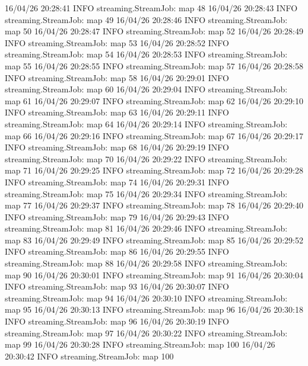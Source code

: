 16/04/26 20:28:41 INFO streaming.StreamJob:  map 48%
16/04/26 20:28:43 INFO streaming.StreamJob:  map 49%
16/04/26 20:28:46 INFO streaming.StreamJob:  map 50%
16/04/26 20:28:47 INFO streaming.StreamJob:  map 52%
16/04/26 20:28:49 INFO streaming.StreamJob:  map 53%
16/04/26 20:28:52 INFO streaming.StreamJob:  map 54%
16/04/26 20:28:53 INFO streaming.StreamJob:  map 55%
16/04/26 20:28:55 INFO streaming.StreamJob:  map 57%
16/04/26 20:28:58 INFO streaming.StreamJob:  map 58%
16/04/26 20:29:01 INFO streaming.StreamJob:  map 60%
16/04/26 20:29:04 INFO streaming.StreamJob:  map 61%
16/04/26 20:29:07 INFO streaming.StreamJob:  map 62%
16/04/26 20:29:10 INFO streaming.StreamJob:  map 63%
16/04/26 20:29:11 INFO streaming.StreamJob:  map 64%
16/04/26 20:29:14 INFO streaming.StreamJob:  map 66%
16/04/26 20:29:16 INFO streaming.StreamJob:  map 67%
16/04/26 20:29:17 INFO streaming.StreamJob:  map 68%
16/04/26 20:29:19 INFO streaming.StreamJob:  map 70%
16/04/26 20:29:22 INFO streaming.StreamJob:  map 71%
16/04/26 20:29:25 INFO streaming.StreamJob:  map 72%
16/04/26 20:29:28 INFO streaming.StreamJob:  map 74%
16/04/26 20:29:31 INFO streaming.StreamJob:  map 75%
16/04/26 20:29:34 INFO streaming.StreamJob:  map 77%
16/04/26 20:29:37 INFO streaming.StreamJob:  map 78%
16/04/26 20:29:40 INFO streaming.StreamJob:  map 79%
16/04/26 20:29:43 INFO streaming.StreamJob:  map 81%
16/04/26 20:29:46 INFO streaming.StreamJob:  map 83%
16/04/26 20:29:49 INFO streaming.StreamJob:  map 85%
16/04/26 20:29:52 INFO streaming.StreamJob:  map 86%
16/04/26 20:29:55 INFO streaming.StreamJob:  map 88%
16/04/26 20:29:58 INFO streaming.StreamJob:  map 90%
16/04/26 20:30:01 INFO streaming.StreamJob:  map 91%
16/04/26 20:30:04 INFO streaming.StreamJob:  map 93%
16/04/26 20:30:07 INFO streaming.StreamJob:  map 94%
16/04/26 20:30:10 INFO streaming.StreamJob:  map 95%
16/04/26 20:30:13 INFO streaming.StreamJob:  map 96%
16/04/26 20:30:18 INFO streaming.StreamJob:  map 96%
16/04/26 20:30:19 INFO streaming.StreamJob:  map 97%
16/04/26 20:30:22 INFO streaming.StreamJob:  map 99%
16/04/26 20:30:28 INFO streaming.StreamJob:  map 100%
16/04/26 20:30:42 INFO streaming.StreamJob:  map 100%
